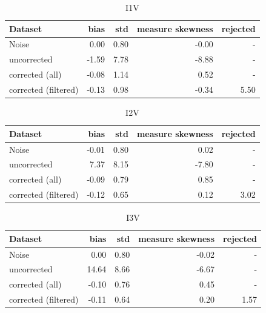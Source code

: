 \documentclass[amt, manuscript]{copernicus}
\begin{document}
\begin{table}[!p]
	\centering
	\begin{tabular}{lrrrr}
		\hline
		Dataset              &   bias &   std &   measure skewness &   rejected \\
		\hline
		Noise                &   0.00 &  0.80 &              -0.00 &       - \\
		uncorrected          &  -1.59 &  7.78 &              -8.88 &       - \\
		corrected (all)      &  -0.08 &  1.14 &               0.52 &       - \\
		corrected (filtered) &  -0.13 &  0.98 &              -0.34 &       5.50 \\
		\hline
	\end{tabular}
	\caption{I1V}
\end{table}

\begin{table}[!p]
	\centering
	\begin{tabular}{lrrrr}
		\hline
		Dataset              &   bias &   std &   measure skewness &   rejected \\
		\hline
		Noise                &  -0.01 &  0.80 &               0.02 &       - \\
		uncorrected          &   7.37 &  8.15 &              -7.80 &       - \\
		corrected (all)      &  -0.09 &  0.79 &               0.85 &       - \\
		corrected (filtered) &  -0.12 &  0.65 &               0.12 &       3.02 \\
		\hline
	\end{tabular}
	\caption{I2V}
\end{table}

\begin{table}[!p]
	\centering
	\begin{tabular}{lrrrr}
		\hline
		Dataset              &   bias &   std &   measure skewness &   rejected \\
		\hline
		Noise                &  0.00 & 0.80 &             -0.02 &      - \\
		uncorrected          & 14.64 & 8.66 &             -6.67 &      - \\
		corrected (all)      & -0.10 & 0.76 &              0.45 &      - \\
		corrected (filtered) & -0.11 & 0.64 &              0.20 &      1.57 \\
		\hline
	\end{tabular}
	\caption{I3V}
\end{table}
\end{document}
